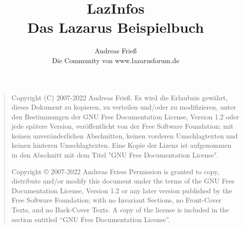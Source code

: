 \documentclass[
titlepage,						%
]
{scrreprt}
\begin{document}
\setcounter{tocdepth}{3} %

\pagestyle{empty} %
\title{LazInfos\\Das Lazarus Beispielbuch}
\author{Andreas Frieß\\Die Community von www.lazarusforum.de}

\maketitle 						%

\pagestyle{headings} %


\begin{quote}
    Copyright (C) 2007-2022 Andreas Frieß.
    Es wird die Erlaubnis gewährt, dieses Dokument zu kopieren, zu
    verteilen und/oder zu modifizieren, unter den Bestimmungen der
    GNU Free Documentation License, Version 1.2 oder jede spätere
    Version, veröffentlicht von der Free Software Foundation; mit
    keinen unveränderlichen Abschnitten, keinen vorderen
    Umschlagtexten und keinen hinteren Umschlagtexten. Eine Kopie der
    Lizenz ist aufgenommen in den Abschnitt mit dem Titel "GNU Free
    Documentation License".

    Copyright \copyright{}  2007-2022 Andreas Friess
    Permission is granted to copy, distribute and/or modify this document
    under the terms of the GNU Free Documentation License, Version 1.2
    or any later version published by the Free Software Foundation;
    with no Invariant Sections, no Front-Cover Texts, and no Back-Cover Texts.
    A copy of the license is included in the section entitled ``GNU
    Free Documentation License''.
\end{quote}
\end{document}
